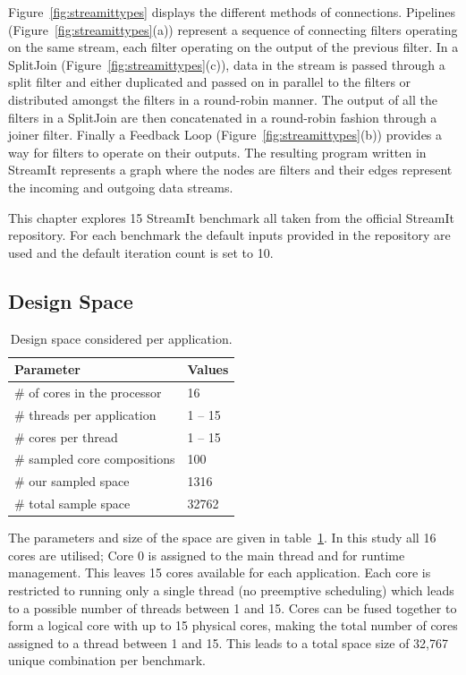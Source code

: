 Figure~\ref{fig:streamittypes} displays the different methods of connections.
Pipelines (Figure~\ref{fig:streamittypes}(a)) represent a sequence of connecting filters operating on the same stream, each filter operating on the output of the previous filter.
In a SplitJoin (Figure~\ref{fig:streamittypes}(c)), data in the stream is passed through a split filter and either duplicated and passed on in parallel to the filters or distributed amongst the filters in a round-robin manner.
The output of all the filters in a SplitJoin are then concatenated in a round-robin fashion through a joiner filter.
Finally a Feedback Loop (Figure~\ref{fig:streamittypes}(b)) provides a way for filters to operate on their outputs.
The resulting program written in StreamIt represents a graph where the nodes are filters and their edges represent the incoming and outgoing data streams.

This chapter explores 15 StreamIt benchmark  all taken from the official StreamIt repository.
For each benchmark the default inputs provided in the repository are used and the default iteration count is set to 10. 

\subsection{Design Space}

\begin{table}
\centering
\begin{tabular} { p{5.2cm}  p{1.8cm} }
      \toprule
      \textbf{Parameter} & \textbf{Values} \\ \midrule
      \# of cores in the processor & 16 \\
      \# threads per application & 1 -- 15 \\
      \# cores per thread & 1 -- 15 \\ \midrule
      \# sampled core compositions & 100 \\ 
      \# our sampled space & 1316 \\
      \# total sample space & 32762 \\ \bottomrule
    \end{tabular}
  \caption{Design space considered per application.}
  \label{tab:space}
\end{table}

The parameters and size of the space are given in table~\ref{tab:space}.
In this study all 16 cores are utilised; Core 0 is assigned to the main thread and for runtime management. 
This leaves 15 cores available for each application.
Each core is restricted to running only a single thread (no preemptive scheduling) which leads to a possible number of threads between 1 and 15.
Cores can be fused together to form a logical core with up to 15 physical cores, making the total number of cores assigned to a thread between 1 and 15.
This leads to a total space size of 32,767 unique combination per benchmark.

